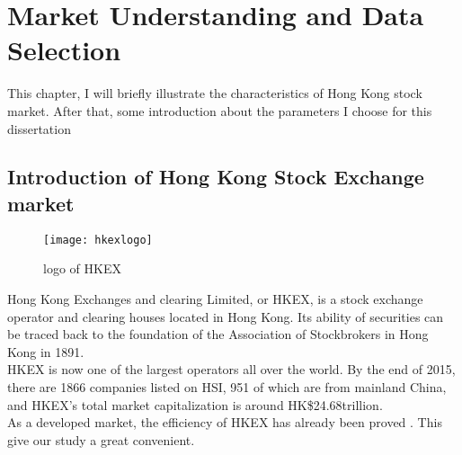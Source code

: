 \chapter{Market Understanding and Data Selection}

This chapter, I will briefly illustrate the characteristics of Hong Kong stock market. After that, some introduction about the parameters I choose for this dissertation

\section{Introduction of Hong Kong Stock Exchange market}

\begin{figure}[h]
	\centering
	\texttt{[image: hkexlogo]}
	\caption{logo of HKEX}
\end{figure}

Hong Kong Exchanges and clearing Limited, or HKEX, is a stock exchange operator and clearing houses located in Hong Kong. Its ability of securities can be traced back to the foundation of the Association of Stockbrokers in Hong Kong in 1891\cite{1_history_hkex_markets_2016}.\\

HKEX is now one of the largest operators all over the world. By the end of 2015, there are 1866 companies listed on HSI, 951 of which are from mainland China, and HKEX’s total market capitalization is around HK\$24.68trillion\cite{hkex_fact_book_2015}.\\

As a developed market, the efficiency of HKEX has already been proved \cite{su2015efficiency}. This give our study a great convenient.
